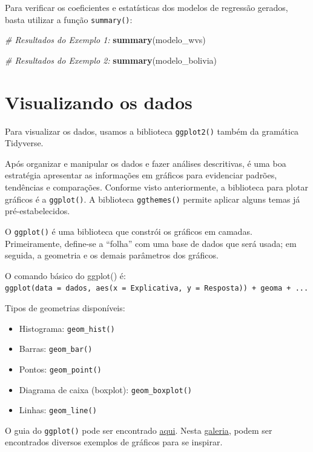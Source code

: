 \documentclass[
  10pt,
  brazil,
  a4paper,
  twoside, notitlepage, openright]{book}
\newenvironment{Shaded}{\begin{snugshade}}{\end{snugshade}}
\newcommand{\CommentTok}[1]{\textcolor[rgb]{0.56,0.35,0.01}{\textit{#1}}}
\newcommand{\KeywordTok}[1]{\textcolor[rgb]{0.13,0.29,0.53}{\textbf{#1}}}
\newcommand{\NormalTok}[1]{#1}
\providecommand{\tightlist}{%
  \setlength{\itemsep}{0pt}\setlength{\parskip}{0pt}}
\begin{document}
Para verificar os coeficientes e estatísticas dos modelos de regressão gerados, basta utilizar a função \texttt{summary()}:

\begin{Shaded}
\begin{Highlighting}[]
\CommentTok{# Resultados do Exemplo 1: }
\KeywordTok{summary}\NormalTok{(modelo_wvs)}

\CommentTok{# Resultados do Exemplo 2: }
\KeywordTok{summary}\NormalTok{(modelo_bolivia)}
\end{Highlighting}
\end{Shaded}

\hypertarget{visualizando-os-dados}{%
\chapter{Visualizando os dados}\label{visualizando-os-dados}}

Para visualizar os dados, usamos a biblioteca \texttt{ggplot2()} também da gramática Tidyverse.

Após organizar e manipular os dados e fazer análises descritivas, é uma boa estratégia apresentar as informações em gráficos para evidenciar padrões, tendências e comparações. Conforme visto anteriormente, a biblioteca para plotar gráficos é a \texttt{ggplot()}. A biblioteca \texttt{ggthemes()} permite aplicar alguns temas já pré-estabelecidos.

O \texttt{ggplot()} é uma biblioteca que constrói os gráficos em camadas. Primeiramente, define-se a ``folha'' com uma base de dados que será usada; em seguida, a geometria e os demais parâmetros dos gráficos.

O comando básico do ggplot() é: \texttt{ggplot(data\ =\ dados,\ aes(x\ =\ Explicativa,\ y\ =\ Resposta))\ +\ geoma\ +\ ...}

Tipos de geometrias disponíveis:

\begin{itemize}
\tightlist
\item
  Histograma: \texttt{geom\_hist()}
\item
  Barras: \texttt{geom\_bar()}
\item
  Pontos: \texttt{geom\_point()}
\item
  Diagrama de caixa (boxplot): \texttt{geom\_boxplot()}
\item
  Linhas: \texttt{geom\_line()}
\end{itemize}

O guia do \texttt{ggplot()} pode ser encontrado \href{https://ggplot2.tidyverse.org/index.html}{aqui}. Nesta \href{https://www.r-graph-gallery.com/}{galeria}, podem ser encontrados diversos exemplos de gráficos para se inspirar.
\end{document}
